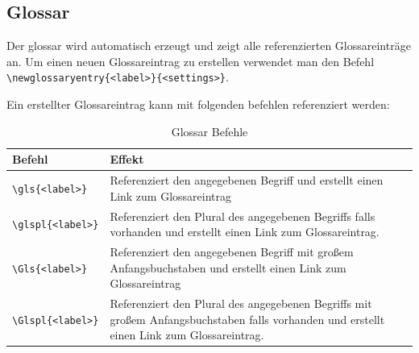 \subsection{Glossar}
Der \gls{glossar} wird automatisch erzeugt und zeigt alle referenzierten Glossareinträge an. Um einen neuen Glossareintrag zu erstellen verwendet man den Befehl\\ \texttt{\textbackslash newglossaryentry\{<label>\}\{<settings>\}}.

Ein erstellter Glossareintrag kann mit folgenden befehlen referenziert werden:
\begin{table}[h!]
	\centering
	\caption[Glossar Befehle]{\label{tab:glossarTabelle}Glossar Befehle}
	\begin{tabular}{lp{10cm}}
		\textbf{Befehl} & \textbf{Effekt}\\\hline
		\texttt{\textbackslash gls\{<label>\}} & Referenziert den angegebenen Begriff und erstellt einen Link zum Glossareintrag\\
		\texttt{\textbackslash glspl\{<label>\}} & Referenziert den Plural des angegebenen Begriffs falls vorhanden und erstellt einen Link zum Glossareintrag.\\
		\texttt{\textbackslash Gls\{<label>\}} & Referenziert den angegebenen Begriff mit großem Anfangsbuchstaben und erstellt einen Link zum Glossareintrag\\
		\texttt{\textbackslash Glspl\{<label>\}} & Referenziert den Plural des angegebenen Begriffs mit großem Anfangsbuchstaben falls vorhanden und erstellt einen Link zum Glossareintrag.\\\hline
	\end{tabular}

\end{table}
